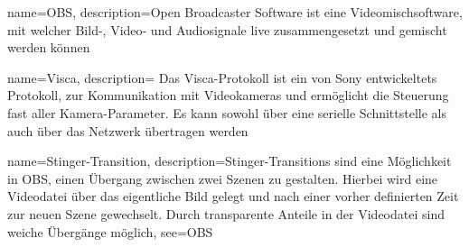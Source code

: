 
 {
	name={OBS},
	description={Open Broadcaster Software ist eine Videomischsoftware, mit welcher Bild-, Video- und Audiosignale live zusammengesetzt und gemischt werden können}
}

 {
	name={Visca},
	description={
		Das Visca-Protokoll ist ein von Sony entwickeltets Protokoll, zur Kommunikation mit Videokameras und ermöglicht die Steuerung fast aller Kamera-Parameter.
		Es kann sowohl über eine serielle Schnittstelle als auch über das Netzwerk übertragen werden
	}
}

 {
	name={Stinger-Transition},
	description={Stinger-Transitions sind eine Möglichkeit in \Gls{OBS}, einen Übergang zwischen zwei Szenen zu gestalten. Hierbei wird eine Videodatei über das eigentliche Bild gelegt und nach einer vorher definierten Zeit zur neuen Szene gewechselt. Durch transparente Anteile in der Videodatei sind weiche Übergänge möglich},
	see={OBS}
}

\printglossary